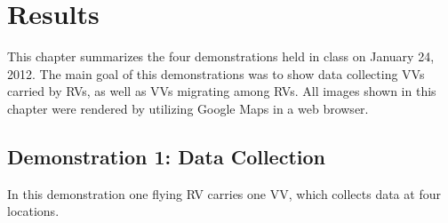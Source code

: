 
\chapter{Results}

This chapter summarizes the four demonstrations held in class on January 24, 2012. The main goal of this
demonstrations was to show data collecting \acp{VV} carried by \acp{RV}, as well as \acp{VV} migrating
among \acp{RV}. All images shown in this chapter were rendered by utilizing Google Maps \cite{GOOGLEMAPS} in a web browser.


\section{Demonstration 1: Data Collection}
In this demonstration one flying \ac{RV} carries one \ac{VV}, which collects data at four locations.
